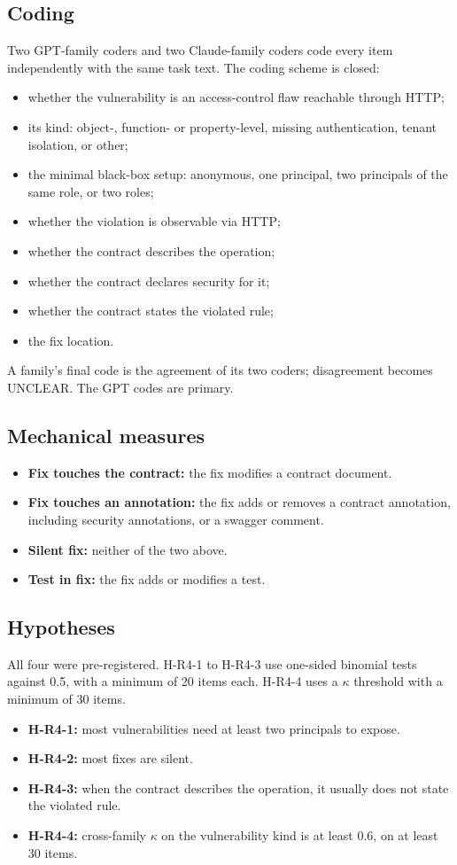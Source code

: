 \documentclass[conference]{IEEEtran}
\begin{document}
\subsection{Coding}
Two GPT-family coders and two Claude-family coders code every item independently with the same task text. The coding scheme is closed:
\begin{itemize}
\item whether the vulnerability is an access-control flaw reachable through HTTP;
\item its kind: object-, function- or property-level, missing authentication, tenant isolation, or other;
\item the minimal black-box setup: anonymous, one principal, two principals of the same role, or two roles;
\item whether the violation is observable via HTTP;
\item whether the contract describes the operation;
\item whether the contract declares security for it;
\item whether the contract states the violated rule;
\item the fix location.
\end{itemize}

A family's final code is the agreement of its two coders; disagreement becomes UNCLEAR. The GPT codes are primary.

\subsection{Mechanical measures}
\begin{itemize}
\item \textbf{Fix touches the contract:} the fix modifies a contract document.
\item \textbf{Fix touches an annotation:} the fix adds or removes a contract annotation, including security annotations, or a swagger comment.
\item \textbf{Silent fix:} neither of the two above.
\item \textbf{Test in fix:} the fix adds or modifies a test.
\end{itemize}

\subsection{Hypotheses}
All four were pre-registered. H-R4-1 to H-R4-3 use one-sided binomial tests against 0.5, with a minimum of 20 items each. H-R4-4 uses a $\kappa$ threshold with a minimum of 30 items.
\begin{itemize}
\item \textbf{H-R4-1:} most vulnerabilities need at least two principals to expose.
\item \textbf{H-R4-2:} most fixes are silent.
\item \textbf{H-R4-3:} when the contract describes the operation, it usually does not state the violated rule.
\item \textbf{H-R4-4:} cross-family $\kappa$ on the vulnerability kind is at least 0.6, on at least 30 items.
\end{itemize}
\end{document}
